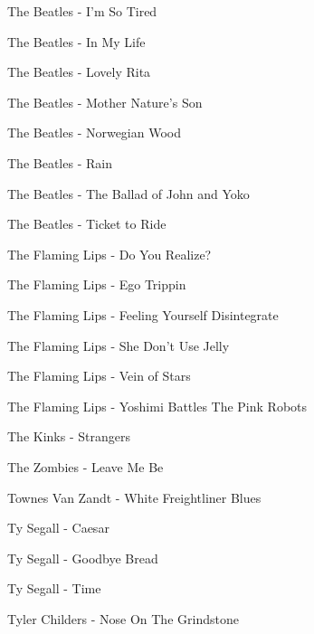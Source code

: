 The Beatles - I'm So Tired \dotfill \pageref{I'm So Tired - The Beatles} 

The Beatles - In My Life \dotfill \pageref{In My Life - The Beatles} 

The Beatles - Lovely Rita \dotfill \pageref{Lovely Rita - The Beatles} 

The Beatles - Mother Nature's Son \dotfill \pageref{Mother Nature's Son - The Beatles} 

The Beatles - Norwegian Wood \dotfill \pageref{Norwegian Wood - The Beatles} 

The Beatles - Rain \dotfill \pageref{Rain - The Beatles} 

The Beatles - The Ballad of John and Yoko \dotfill \pageref{The Ballad of John and Yoko - The Beatles} 

The Beatles - Ticket to Ride \dotfill \pageref{Ticket to Ride - The Beatles} 

The Flaming Lips - Do You Realize? \dotfill \pageref{Do You Realize? - The Flaming Lips} 

The Flaming Lips - Ego Trippin \dotfill \pageref{Ego Trippin - The Flaming Lips} 

The Flaming Lips - Feeling Yourself Disintegrate \dotfill \pageref{Feeling Yourself Disintegrate - The Flaming Lips} 

The Flaming Lips - She Don't Use Jelly \dotfill \pageref{She Don't Use Jelly - The Flaming Lips} 

The Flaming Lips - Vein of Stars \dotfill \pageref{Vein of Stars - The Flaming Lips} 

The Flaming Lips - Yoshimi Battles The Pink Robots \dotfill \pageref{Yoshimi Battles The Pink Robots - The Flaming Lips} 

The Kinks - Strangers \dotfill \pageref{Strangers - The Kinks} 

The Zombies - Leave Me Be \dotfill \pageref{Leave Me Be - The Zombies} 

Townes Van Zandt - White Freightliner Blues \dotfill \pageref{White Freightliner Blues - Townes Van Zandt} 

Ty Segall - Caesar \dotfill \pageref{Caesar - Ty Segall} 

Ty Segall - Goodbye Bread \dotfill \pageref{Goodbye Bread - Ty Segall} 

Ty Segall - Time \dotfill \pageref{Time - Ty Segall} 

Tyler Childers - Nose On The Grindstone \dotfill \pageref{Nose On The Grindstone - Tyler Childers} 

